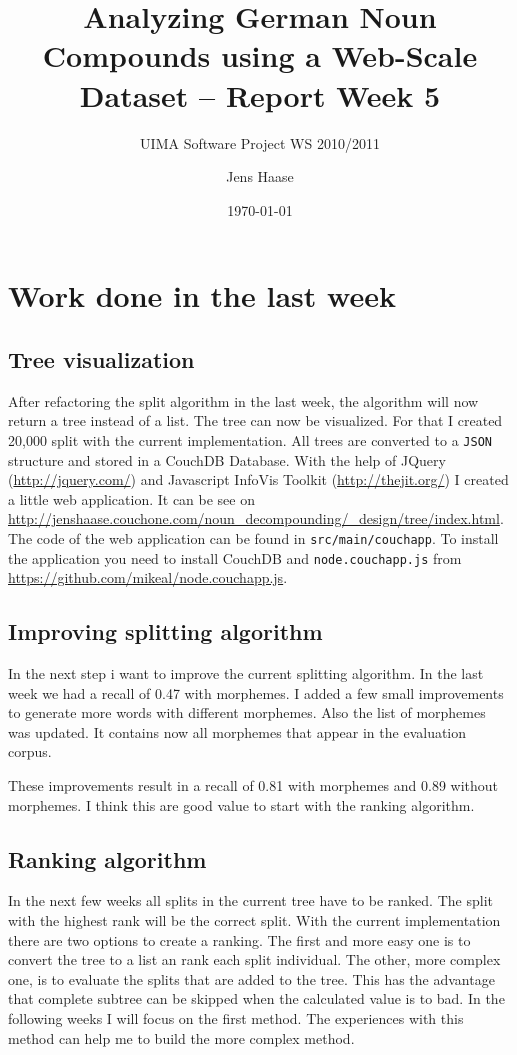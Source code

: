 \documentclass[11pt, accentcolor=tud9b, nochapname]{tudexercise}
\begin{document}
\author{Jens Haase}
\title{Analyzing German Noun Compounds using a
  Web-Scale Dataset -- Report Week 5}
\subtitle{UIMA Software Project WS 2010/2011}
\date{\today}
\maketitle

\section{Work done in the last week}

\subsection{Tree visualization}
After refactoring the split algorithm in the last week, the algorithm will now return a tree instead of a list. The tree can now be visualized. For that I created 20,000 split with the current implementation. All trees are converted to a \texttt{JSON} structure and stored in a CouchDB Database. With the help of JQuery (\url{http://jquery.com/}) and Javascript InfoVis Toolkit (\url{http://thejit.org/}) I created a little web application. It can be see on \url{http://jenshaase.couchone.com/noun_decompounding/_design/tree/index.html}. The code of the web application can be found in \texttt{src/main/couchapp}. To install the application you need to install CouchDB and \texttt{node.couchapp.js} from \url{ https://github.com/mikeal/node.couchapp.js}.

\subsection{Improving splitting algorithm}
In the next step i want to improve the current splitting algorithm. In the last week we had a recall of 0.47 with morphemes. I added a few small improvements to generate more words with different morphemes. Also the list of morphemes was updated. It contains now all morphemes that appear in the evaluation corpus.

These improvements result in a recall of 0.81 with morphemes and 0.89 without morphemes. I think this are good value to start with the ranking algorithm.

\subsection{Ranking algorithm}
In the next few weeks all splits in the current tree have to be ranked. The split with the highest rank will be the correct split. With the current implementation there are two options to create a ranking. The first and more easy one is to convert the tree to a list an rank each split individual. The other, more complex one, is to evaluate the splits that are added to the tree. This has the advantage that complete subtree can be skipped when the calculated value is to bad. In the following weeks I will focus on the first method. The experiences with this method can help me to build the more complex method.
\end{document}
